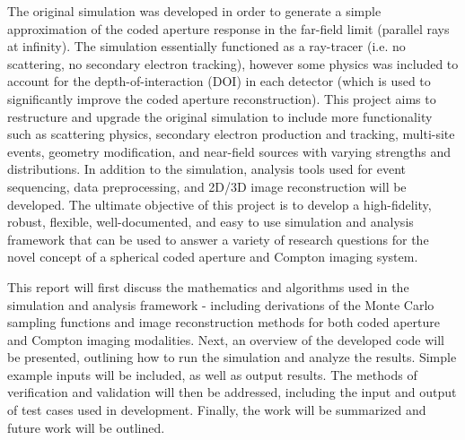 \documentclass[10pt]{article}
\begin{document}
The original simulation was developed in order to generate a simple approximation of the coded aperture response in the far-field limit (parallel rays at infinity). The simulation essentially functioned as a ray-tracer (i.e. no scattering, no secondary electron tracking), however some physics was included to account for the depth-of-interaction (DOI) in each detector (which is used to significantly improve the coded aperture reconstruction). This project aims to restructure and upgrade the original simulation to include more functionality such as scattering physics, secondary electron production and tracking, multi-site events, geometry modification, and near-field sources with varying strengths and distributions. In addition to the simulation, analysis tools used for event sequencing, data preprocessing, and 2D/3D image reconstruction will be developed. The ultimate objective of this project is to develop a high-fidelity, robust, flexible, well-documented, and easy to use simulation and analysis framework that can be used to answer a variety of research questions for the novel concept of a spherical coded aperture and Compton imaging system. 

This report will first discuss the mathematics and algorithms used in the simulation and analysis framework - including derivations of the Monte Carlo sampling functions and image reconstruction methods for both coded aperture and Compton imaging modalities. Next, an overview of the developed code will be presented, outlining how to run the simulation and analyze the results. Simple example inputs will be included, as well as output results. The methods of verification and validation will then be addressed, including the input and output of test cases used in development. Finally, the work will be summarized and future work will be outlined. 
\end{document}
